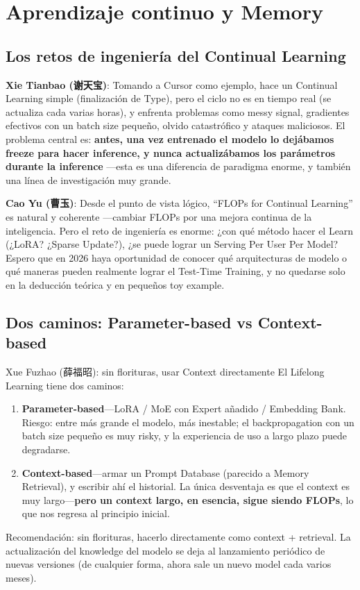 \section{Aprendizaje continuo y Memory}

\subsection{Los retos de ingeniería del Continual Learning}

\textbf{Xie Tianbao (谢天宝)}: Tomando a Cursor como ejemplo, hace un Continual Learning simple (finalización de Type), pero el ciclo no es en tiempo real (se actualiza cada varias horas), y enfrenta problemas como messy signal, gradientes efectivos con un batch size pequeño, olvido catastrófico y ataques maliciosos. El problema central es: \textbf{antes, una vez entrenado el modelo lo dejábamos freeze para hacer inference, y nunca actualizábamos los parámetros durante la inference} —esta es una diferencia de paradigma enorme, y también una línea de investigación muy grande.

\textbf{Cao Yu (曹玉)}: Desde el punto de vista lógico, ``FLOPs for Continual Learning'' es natural y coherente —cambiar FLOPs por una mejora continua de la inteligencia. Pero el reto de ingeniería es enorme: ¿con qué método hacer el Learn (¿LoRA? ¿Sparse Update?), ¿se puede lograr un Serving Per User Per Model? Espero que en 2026 haya oportunidad de conocer qué arquitecturas de modelo o qué maneras pueden realmente lograr el Test-Time Training, y no quedarse solo en la deducción teórica y en pequeños toy example.

\subsection{Dos caminos: Parameter-based vs Context-based}

\begin{knowledgebox}{Xue Fuzhao (薛福昭): sin florituras, usar Context directamente}
El Lifelong Learning tiene dos caminos:
\begin{enumerate}
  \item \textbf{Parameter-based}—LoRA / MoE con Expert añadido / Embedding Bank. Riesgo: entre más grande el modelo, más inestable; el backpropagation con un batch size pequeño es muy risky, y la experiencia de uso a largo plazo puede degradarse.
  \item \textbf{Context-based}—armar un Prompt Database (parecido a Memory Retrieval), y escribir ahí el historial. La única desventaja es que el context es muy largo—\textbf{pero un context largo, en esencia, sigue siendo FLOPs}, lo que nos regresa al principio inicial.
\end{enumerate}
Recomendación: sin florituras, hacerlo directamente como context + retrieval. La actualización del knowledge del modelo se deja al lanzamiento periódico de nuevas versiones (de cualquier forma, ahora sale un nuevo model cada varios meses).
\end{knowledgebox}


